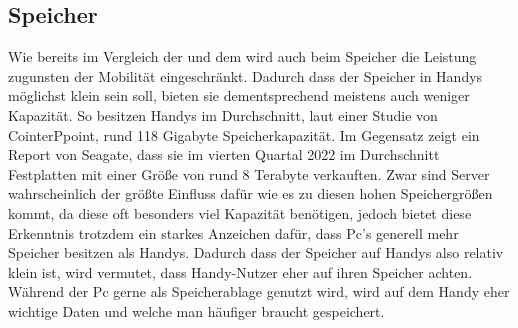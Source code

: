 \subsection{Speicher}\myCheckmark
Wie bereits im Vergleich der  und dem  wird auch beim Speicher die Leistung zugunsten der Mobilität eingeschränkt. 
Dadurch dass der Speicher in Handys möglichst klein sein soll, bieten sie dementsprechend meistens auch weniger Kapazität. 
	So besitzen Handys im Durchschnitt, laut einer Studie von CointerPpoint, rund 118 Gigabyte Speicherkapazität\cite{pcVsphone_storageSmartphone}. Im Gegensatz zeigt ein Report von Seagate, dass sie im vierten Quartal 2022 im Durchschnitt Festplatten mit einer Größe von rund 8 Terabyte verkauften\cite{pcVsphone_storageSeagate}. 
	Zwar sind Server wahrscheinlich der größte Einfluss dafür wie es zu diesen hohen Speichergrößen kommt, da diese oft besonders viel Kapazität benötigen, jedoch bietet diese Erkenntnis trotzdem ein starkes Anzeichen dafür, dass Pc's generell mehr Speicher besitzen als Handys.\newline%
Dadurch dass der Speicher auf Handys also relativ klein ist, wird vermutet, dass Handy-Nutzer eher auf ihren Speicher achten. Während der Pc gerne als Speicherablage genutzt wird, wird auf dem Handy eher wichtige Daten und welche man häufiger braucht gespeichert.
   


